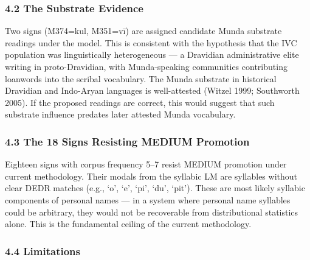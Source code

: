\documentclass[
]{article}
\begin{document}
\subsubsection{4.2 The Substrate Evidence}\label{the-substrate-evidence}

Two signs (M374=kul, M351=vī) are assigned candidate Munda substrate readings under the model. This is
consistent with the hypothesis that the IVC population was
linguistically heterogeneous --- a Dravidian administrative elite
writing in proto-Dravidian, with Munda-speaking communities contributing
loanwords into the scribal vocabulary. The Munda substrate in historical
Dravidian and Indo-Aryan languages is well-attested (Witzel 1999;
Southworth 2005). If the proposed readings are correct, this would suggest that such substrate influence predates later attested Munda vocabulary.

\subsubsection{4.3 The 18 Signs Resisting MEDIUM Promotion}\label{the-18-signs-resisting-medium}

Eighteen signs with corpus frequency 5--7 resist MEDIUM promotion under current methodology. Their modals
from the syllabic LM are syllables without clear DEDR matches (e.g.,
`o', `e', `pi', `du', `pit'). These are most likely syllabic components
of personal names --- in a system where personal name syllables could be
arbitrary, they would not be recoverable from distributional statistics
alone. This is the fundamental ceiling of the current methodology.

\subsubsection{4.4 Limitations}\label{limitations}
\end{document}
